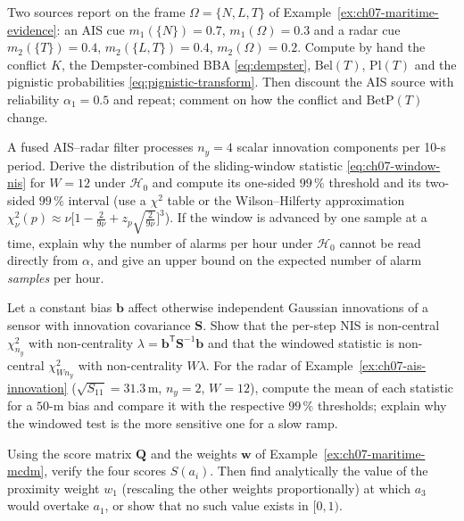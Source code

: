 \problemsection
\begin{prob}\label{prob:ch07:1}
Two sources report on the frame $\Omega=\{N,L,T\}$ of Example~\ref{ex:ch07-maritime-evidence}: an AIS cue $m_1(\{N\})=0.7$, $m_1(\Omega)=0.3$ and a radar cue $m_2(\{T\})=0.4$, $m_2(\{L,T\})=0.4$, $m_2(\Omega)=0.2$. Compute by hand the conflict $K$, the Dempster-combined BBA \eqref{eq:dempster}, $\mathrm{Bel}(T)$, $\mathrm{Pl}(T)$ and the pignistic probabilities \eqref{eq:pignistic-transform}. Then discount the AIS source with reliability $\alpha_1=0.5$ and repeat; comment on how the conflict and $\mathrm{BetP}(T)$ change.
\end{prob}
\begin{prob}\label{prob:ch07:2}
A fused AIS--radar filter processes $n_y=4$ scalar innovation components per 10-s period. Derive the distribution of the sliding-window statistic \eqref{eq:ch07-window-nis} for $W=12$ under $\mathcal{H}_0$ and compute its one-sided $99\,\%$ threshold and its two-sided $99\,\%$ interval (use a $\chi^{2}$ table or the Wilson--Hilferty approximation $\chi^{2}_{\nu}(p)\approx\nu\bigl[1-\tfrac{2}{9\nu}+z_p\sqrt{\tfrac{2}{9\nu}}\bigr]^{3}$). If the window is advanced by one sample at a time, explain why the number of alarms per hour under $\mathcal{H}_0$ cannot be read directly from $\alpha$, and give an upper bound on the expected number of alarm \emph{samples} per hour.
\end{prob}
\begin{prob}\label{prob:ch07:3}
Let a constant bias $\mathbf{b}$ affect otherwise independent Gaussian innovations of a sensor with innovation covariance $\mathbf{S}$. Show that the per-step NIS is non-central $\chi^{2}_{n_y}$ with non-centrality $\lambda=\mathbf{b}^{\mathsf T}\mathbf{S}^{-1}\mathbf{b}$ and that the windowed statistic is non-central $\chi^{2}_{Wn_y}$ with non-centrality $W\lambda$. For the radar of Example~\ref{ex:ch07-ais-innovation} ($\sqrt{S_{11}}=31.3$\,m, $n_y=2$, $W=12$), compute the mean of each statistic for a $50$-m bias and compare it with the respective $99\,\%$ thresholds; explain why the windowed test is the more sensitive one for a slow ramp.
\end{prob}
\begin{prob}\label{prob:ch07:4}
Using the score matrix $\mathbf{Q}$ and the weights $\mathbf{w}$ of Example~\ref{ex:ch07-maritime-mcdm}, verify the four scores $S(a_i)$. Then find analytically the value of the proximity weight $w_1$ (rescaling the other weights proportionally) at which $a_3$ would overtake $a_1$, or show that no such value exists in $[0,1)$.
\end{prob}
